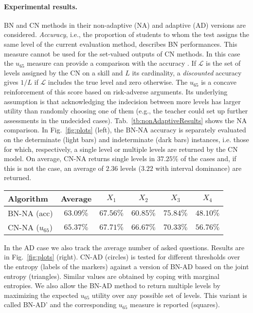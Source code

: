 \documentclass[runningheads]{llncs}
\begin{document}
	\paragraph{Experimental results.} 
	BN and CN methods in their non-adaptive (NA) and adaptive (AD) versions are 
	considered. \emph{Accuracy}, i.e., the proportion of students to whom the test assigns 
	the same level of the current evaluation method, describes BN performances. This 
	measure cannot be used for the set-valued outputs of CN methods. In this case the 
	$u_{65}$ measure can provide a comparison with the accuracy 
	\cite{zaffalon2012evaluating}. If $\mathcal{L}$ is the set of levels assigned by the CN 
	on a skill and $L$ its cardinality, a \emph{discounted} accuracy gives $1/L$ if 
	$\mathcal{L}$ includes the true level and zero otherwise. The $u_{65}$ is a concave 
	reinforcement of this score based on risk-adverse arguments. Its underlying 
	assumption is that acknowledging the indecision between more levels has larger utility 
	than randomly choosing one of them (e.g., the teacher could set up further 
	assessments in the undecided cases). Tab.~\ref{tb:nonAdaptiveResults} shows the NA 
	comparison. In Fig.~\ref{fig:plots} (left), the BN-NA accuracy is separately evaluated on 
	the determinate (light bars) and indeterminate (dark bars) instances, i.e. those for 
	which, respectively, a single level or multiple levels are returned by the CN model. On 
	average, CN-NA returns single levels in $37.25\%$ of the cases and, if this is not the 
	case, an average of $2.36$ levels ($3.22$ with interval dominance) are returned. 
	
	\begin{table*}[htp!]
		\centering
		\begin{tabular}{@{}lccccc@{}}\toprule
			Algorithm&\phantom{aa}Average\phantom{aa}&\phantom{aaa}$X_1$\phantom{aaa}&\phantom{aaa}$X_2$\phantom{aaa}&
			 \phantom{aaa}$X_3$\phantom{aaa}&\phantom{aaa}$X_4$\phantom{aaa}\\
			\midrule
			BN-NA (acc)&$63.09\%$&$	67.56	\%$&$60.85\%$&${	75.84	
			\%}$&$48.10\%$\\
			CN-NA ($u_{65}$)& ${65.37\%}$&$67.71\%$&${66.67\%}$&$	
			70.33\%$&${56.76\%}$\\
			\bottomrule
		\end{tabular}
		\caption{Non-adaptive tests results.}\label{tb:nonAdaptiveResults}
	\end{table*}
	
	In the AD case we also track the average number of asked questions. Results are in 
	Fig.~\ref{fig:plots} (right). CN-AD (circles) is tested for different thresholds over the 
	entropy (labels of the markers) against a version of BN-AD based on the joint entropy 
	(triangles). Similar values are obtained by coping with marginal entropies. We also allow 
	the BN-AD method to return multiple levels by maximizing the expected $u_{65}$ utility 
	over any possible set of levels. This variant is called BN-AD' and the corresponding 
	$u_{65}$ measure is reported  (squares).
	
\end{document}
